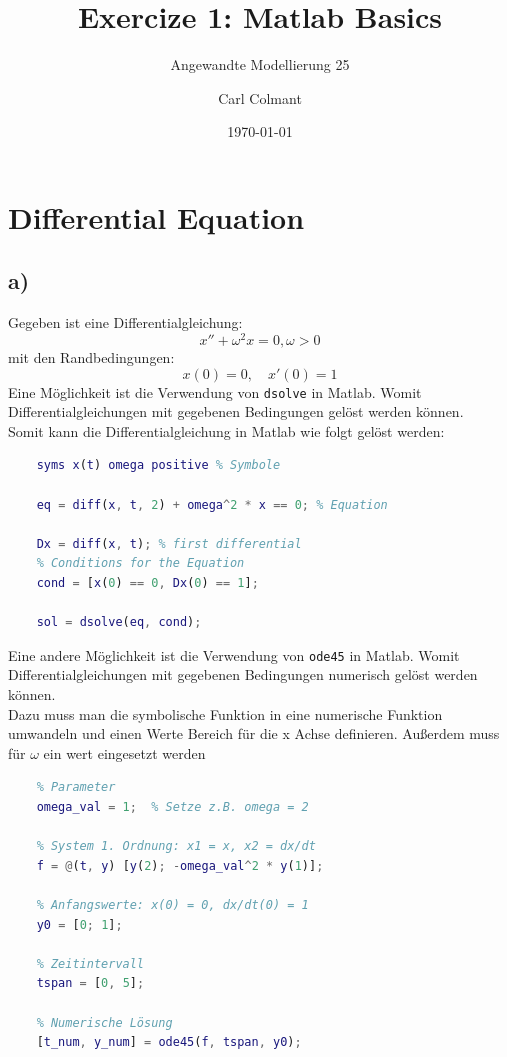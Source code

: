 \documentclass{scrartcl}
\title{Exercize 1: Matlab Basics}
\subtitle{Angewandte Modellierung 25}
\author{Carl Colmant}
\date{\today}
\begin{document}
\maketitle
\section*{Differential Equation}

\subsection*{a)}
Gegeben ist eine Differentialgleichung:
\begin{equation*}
    x''+\omega^2x=0 , \omega>0
\end{equation*}
mit den Randbedingungen:
\begin{equation*}
    x(0)=0,\quad x'(0)=1
\end{equation*}
Eine Möglichkeit ist die Verwendung von \texttt{dsolve} in Matlab. Womit Differentialgleichungen mit gegebenen Bedingungen gelöst werden können.\\
Somit kann die Differentialgleichung in Matlab wie folgt gelöst werden:
\begin{lstlisting}[language=Matlab, caption=Symbolic Math]
    %Symbolic Math:
    syms x(t) omega positive % Symbole

    eq = diff(x, t, 2) + omega^2 * x == 0; % Equation

    Dx = diff(x, t); % first differential
    % Conditions for the Equation
    cond = [x(0) == 0, Dx(0) == 1]; 

    sol = dsolve(eq, cond);
\end{lstlisting}

Eine andere Möglichkeit ist die Verwendung von \texttt{ode45} in Matlab. Womit Differentialgleichungen mit gegebenen Bedingungen numerisch gelöst werden können.\\
Dazu muss man die symbolische Funktion in eine numerische Funktion umwandeln und einen Werte Bereich für die x Achse definieren. Außerdem muss für $\omega$ ein wert eingesetzt werden \\
\begin{lstlisting}[language=Matlab, caption=Numeric Math]
    % numeric Math:
    % Parameter
    omega_val = 1;  % Setze z.B. omega = 2

    % System 1. Ordnung: x1 = x, x2 = dx/dt
    f = @(t, y) [y(2); -omega_val^2 * y(1)];

    % Anfangswerte: x(0) = 0, dx/dt(0) = 1
    y0 = [0; 1];

    % Zeitintervall
    tspan = [0, 5];

    % Numerische Lösung
    [t_num, y_num] = ode45(f, tspan, y0);
    \end{lstlisting}
\end{document}
